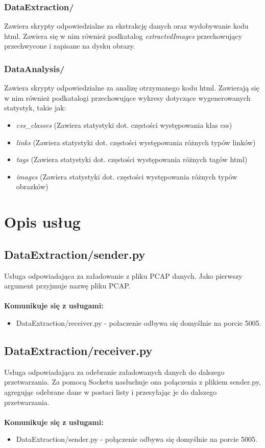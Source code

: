 \documentclass[12pt]{article}
\begin{document}
\subsubsection{DataExtraction/}
Zawiera skrypty odpowiedzialne za ekstrakcję danych oraz wydobywanie kodu html. Zawiera się w nim również podkatalog \emph{extractedImages} przechowujący przechwycone i zapisane na dysku obrazy.
\subsubsection{DataAnalysis/}
Zawiera skrypty odpowiedzialne za analizę otrzymanego kodu html. 
Zawierają się w nim również podkatalogi przechowujące wykresy dotyczące wygenerowanych statystyk, takie jak: 
\begin{itemize}
\item \emph{css\_classes} (Zawiera statystyki dot. częstości występowania klas css)
\item \emph{links}  (Zawiera statystyki dot. częstości występowania różnych typów linków)
\item  \emph{tags}  (Zawiera statystyki dot. częstości występowania różnych tagów html)
\item  \emph{images}  (Zawiera statystyki dot. częstości występowania różnych typów obrazków)
\end{itemize}  
\section{Opis usług}
\subsection{DataExtraction/sender.py}
Usługa odpowiadająca za załadowanie z pliku PCAP danych. Jako pierwszy argument przyjmuje nazwę pliku PCAP. 
\mbox{}\\\\
\textbf{Komunikuje się z usługami:}\\
\begin{itemize}
\item DataExtraction/receiver.py - połaczenie odbywa się domyślnie na porcie 5005.
\end{itemize} 


\subsection{DataExtraction/receiver.py}
Usługa odpowiadająca za odebranie załadowanych danych do dalszego przetwarzania. Za pomocą Socketu nasłuchuje ona połączenia z plikiem sender.py, agregując odebrane dane w postaci listy i przesyłając je do dalszego przetwarzania.
\mbox{}\\\\
\textbf{Komunikuje się z usługami:}\\
\begin{itemize}
\item DataExtraction/sender.py - połączenie odbywa się domyślnie na porcie 5005.
\end{itemize} 
\end{document}
